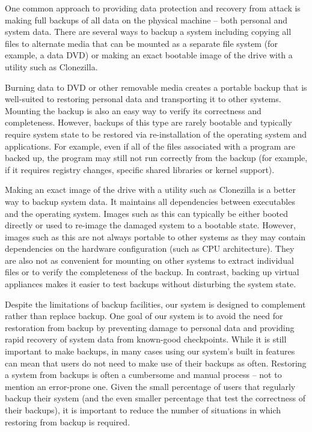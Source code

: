 One common approach to providing data protection and recovery from attack is making full backups of all data on the physical machine – both personal and system data. There are several ways to backup a system including copying all files to alternate media that can be mounted as a separate file system (for example, a data DVD) or making an exact bootable image of the drive with a utility such as Clonezilla\cite{clonezilla_website}.
 
Burning data to DVD or other removable media creates a portable backup that is well-suited to restoring personal data and transporting it to other systems. Mounting the backup is also an easy way to verify its correctness and completeness. However, backups of this type are rarely bootable and typically require system state to be restored via re-installation of the operating system and applications. For example, even if all of the files associated with a program are backed up, the program may still not run correctly from the backup (for example, if it requires registry changes, specific shared libraries or kernel support).
 
Making an exact image of the drive with a utility such as Clonezilla is a better way to backup system data. It maintains all dependencies between executables and the operating system. Images such as this can typically be either booted directly or used to re-image the damaged system to a bootable state. However, images such as this are not always portable to other systems as they may contain dependencies on the hardware configuration (such as CPU architecture). They are also not as convenient for mounting on other systems to extract individual files or to verify the completeness of the backup. In contrast, backing up virtual appliances makes it easier to test backups without disturbing the system state.
 
Despite the limitations of backup facilities, our system is designed to complement rather than replace backup. One goal of our system is to avoid the need for restoration from backup by preventing damage to personal data and providing rapid recovery of system data from known-good checkpoints. While it is still important to make backups, in many cases using our system's built in features can mean that users do not need to make use of their backups as often. Restoring a system from backups is often a cumbersome and manual process – not to mention an error-prone one. Given the small percentage of users that regularly backup their system (and the even smaller percentage that test the correctness of their backups), it is important to reduce the number of situations in which restoring from backup is required.
 
